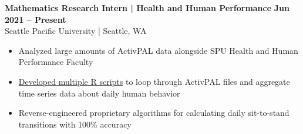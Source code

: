 \textbf{Mathematics Research Intern | Health and Human Performance} \hfill \textbf{Jun 2021 -- Present}\\
    Seattle Pacific University | Seattle, WA
    \squish
    \begin{itemize}
        \item Analyzed large amounts of ActivPAL data alongside SPU Health and Human Performance Faculty
        \item \href{https://github.com/jonmgeiger/activPAL/tree/main/scripts_jon}{Developed multiple R scripts} to loop through ActivPAL files and aggregate time series data about daily human behavior
        \item Reverse-engineered proprietary algorithms for calculating daily sit-to-stand transitions with 100\% accuracy
    \end{itemize}